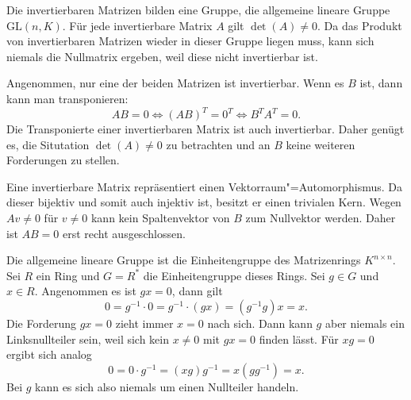 \documentclass[a4paper,10pt,fleqn,twoside]{scrartcl}
\numberwithin{equation}{section}
\newcommand{\strong}[1]{{\normalfont\sffamily\bfseries #1}}
\theoremstyle{Aufgabe}
\begin{document}
\noindent\strong{Lösung.}
Die invertierbaren Matrizen bilden eine Gruppe, die allgemeine
lineare Gruppe $\mathrm{GL}(n,K)$. Für jede invertierbare Matrix $A$
gilt $\det(A)\ne 0$. Da das Produkt von invertierbaren Matrizen
wieder in dieser Gruppe liegen muss, kann sich niemals die Nullmatrix
ergeben, weil diese nicht invertierbar ist.

Angenommen, nur eine der beiden Matrizen ist invertierbar. Wenn es
$B$ ist, dann kann man transponieren:%
\begin{equation}
AB=0 \iff (AB)^T = 0^T \iff B^T A^T = 0.
\end{equation}
Die Transponierte einer invertierbaren Matrix ist auch invertierbar.
Daher genügt es, die Situtation $\det(A)\ne 0$ zu betrachten
und an $B$ keine weiteren Forderungen zu stellen.

Eine invertierbare Matrix repräsentiert einen
Vektorraum"=Automorphismus. Da dieser bijektiv und somit auch injektiv
ist, besitzt er einen trivialen Kern. Wegen $Av\ne 0$ für $v\ne 0$
kann kein Spaltenvektor von $B$ zum Nullvektor werden. Daher ist $AB=0$
erst recht ausgeschlossen.

Die allgemeine lineare Gruppe ist die Einheitengruppe des Matrizenrings
$K^{n\times n}$. Sei $R$ ein Ring und $G=R^*$ die Einheitengruppe
dieses Rings. Sei $g\in G$ und $x\in R$. Angenommen es ist $gx=0$,
dann gilt%
\begin{equation}
0 = g^{-1}\cdot 0 = g^{-1}\cdot (gx) = (g^{-1}g)x = x.
\end{equation}
Die Forderung $gx=0$ zieht immer $x=0$ nach sich. Dann kann $g$ aber
niemals ein Linksnullteiler sein, weil sich kein $x\ne 0$ mit $gx=0$
finden lässt. Für $xg=0$ ergibt sich analog%
\begin{equation}
0 = 0\cdot g^{-1} = (xg)g^{-1} = x(gg^{-1}) = x.
\end{equation}
Bei $g$ kann es sich also niemals um einen Nullteiler handeln.
\end{document}
